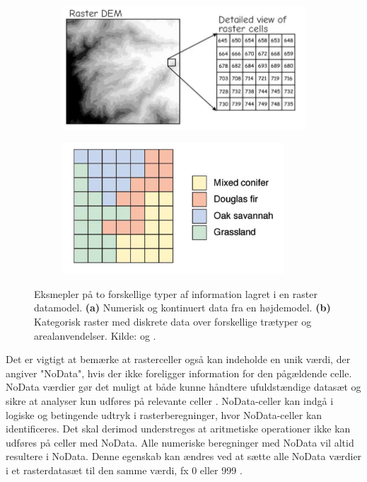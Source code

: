 \begin{figure}[H]
    \begin{subfigure} [t]{0.5\textwidth}
        \centering
        \includegraphics[width=1\linewidth]{images/teori/raster_kontinuert.jpg}
        \caption{}
        \label{Subfig: Kontinuer raster}
    \end{subfigure}
    \begin{subfigure} [t]{0.5\textwidth}
        \centering
        \includegraphics[width=1\linewidth]{images/teori/raster_areal.png}
        \caption{}
        \label{Subfig: Kategorisk raster}
    \end{subfigure}
    \caption{Eksmepler på to forskellige typer af information lagret i en raster datamodel. \textbf{(a)} Numerisk og kontinuert data fra en højdemodel. \textbf{(b)} Kategorisk raster med diskrete data over forskellige trætyper og arealanvendelser. Kilde: \cite[s. 66]{bolstad_gis_2022} og \cite[s. 67]{longley_geographical_2008}.}
    \label{Figur: Kontinuert og kategorisk raster}
\end{figure}
Det er vigtigt at bemærke at rasterceller også kan indeholde en unik værdi, der angiver "NoData", hvis der ikke foreligger information for den pågældende celle. NoData værdier gør det muligt at både kunne håndtere ufuldstændige datasæt og sikre at analyser kun udføres på relevante celler \citep{bolstad_gis_2022, longley_geographical_2008}. NoData-celler kan indgå i logiske og betingende udtryk i rasterberegninger, hvor NoData-celler kan identificeres. Det skal derimod understreges at aritmetiske operationer ikke kan udføres på celler med NoData. Alle numeriske beregninger med NoData vil altid resultere i NoData. Denne egenskab kan ændres ved at sætte alle NoData værdier i et rasterdatasæt til den samme værdi, fx 0 eller 999 \citep{bolstad_gis_2022}.\\

